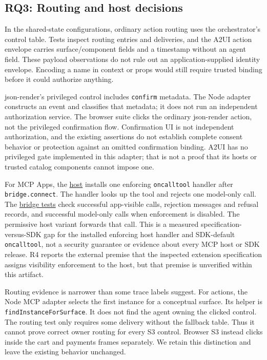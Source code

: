 \documentclass[11pt]{article}
\begin{document}
\subsection{RQ3: Routing and host
decisions}\label{rq3-routing-and-host-decisions}

In the shared-state configurations, ordinary action routing uses the
orchestrator's control table. Tests inspect routing entries and
deliveries, and the A2UI action envelope carries surface/component
fields and a timestamp without an agent field. These payload
observations do not rule out an application-supplied identity envelope.
Encoding a name in context or props would still require trusted binding
before it could authorize anything.

json-render's privileged control includes \texttt{confirm} metadata. The
Node adapter constructs an event and classifies that metadata; it does
not run an independent authorization service. The browser suite clicks
the ordinary json-render action, not the privileged confirmation flow.
Confirmation UI is not independent authorization, and the existing
assertions do not establish complete consent behavior or protection
against an omitted confirmation binding. A2UI has no privileged gate
implemented in this adapter; that is not a proof that its hosts or
trusted catalog components cannot impose one.

For MCP Apps, the \href{../src/adapters/mcp-apps/host.ts}{host} installs
one enforcing \texttt{oncalltool} handler after \texttt{bridge.connect}.
The handler looks up the tool and rejects one model-only call. The
\href{../tests/protocol/mcp-apps-bridge.test.ts}{bridge tests} check
successful app-visible calls, rejection messages and refusal records,
and successful model-only calls when enforcement is disabled. The
permissive host variant forwards that call. This is a measured
specification-versus-SDK gap for the installed enforcing host handler
and SDK-default \texttt{oncalltool}, not a security guarantee or
evidence about every MCP host or SDK release. R4 reports the external
premise that the inspected extension specification assigns visibility
enforcement to the host, but that premise is unverified within this
artifact.

Routing evidence is narrower than some trace labels suggest. For
actions, the Node MCP adapter selects the first instance for a
conceptual surface. Its helper is \texttt{findInstanceForSurface}. It
does not find the agent owning the clicked control. The routing test
only requires some delivery without the fallback table. Thus it cannot
prove correct owner routing for every S3 control. Browser S3 instead
clicks inside the cart and payments frames separately. We retain this
distinction and leave the existing behavior unchanged.
\end{document}
